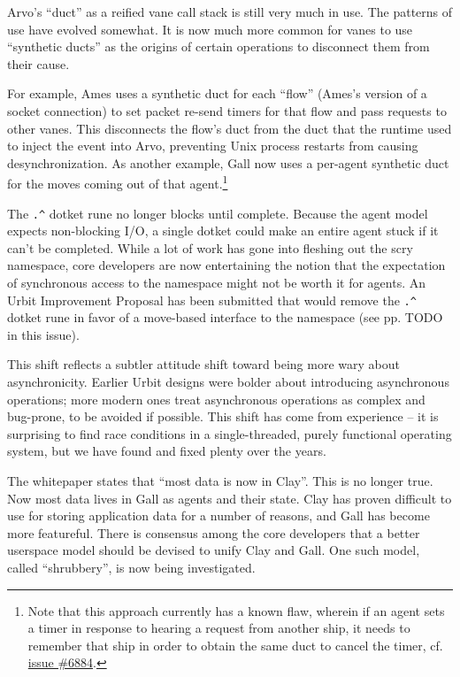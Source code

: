 \documentclass[twoside]{article}
\begin{document}
Arvo's ``duct'' as a reified vane call stack is still very much in use.  The patterns of use have evolved somewhat.  It is now much more common for vanes to use ``synthetic ducts'' as the origins of certain operations to disconnect them from their cause.

For example, Ames uses a synthetic duct for each ``flow'' (Ames's version of a socket connection) to set packet re-send timers for that flow and pass requests to other vanes.  This disconnects the flow's duct from the duct that the runtime used to inject the event into Arvo, preventing Unix process restarts from causing desynchronization.  As another example, Gall now uses a per-agent synthetic duct for the moves coming out of that agent.\footnote{Note that this approach currently has a known flaw, wherein if an agent sets a timer in response to hearing a request from another ship, it needs to remember that ship in order to obtain the same duct to cancel the timer, cf. \href{https://github.com/urbit/urbit/issues/6884}{issue \#6884}.}

The \lstinline[style=inlinecode]{.^} dotket rune no longer blocks until complete.  Because the agent model expects non-blocking I/O, a single dotket could make an entire agent stuck if it can't be completed.  While a lot of work has gone into fleshing out the scry namespace, core developers are now entertaining the notion that the expectation of synchronous access to the namespace might not be worth it for agents.  An Urbit Improvement Proposal has been submitted that would remove the \lstinline[style=inlinecode]{.^} dotket rune in favor of a move-based interface to the namespace (see pp. TODO in this issue).

This shift reflects a subtler attitude shift toward being more wary about asynchronicity.  Earlier Urbit designs were bolder about introducing asynchronous operations; more modern ones treat asynchronous operations as complex and bug-prone, to be avoided if possible.  This shift has come from experience – it is surprising to find race conditions in a single-threaded, purely functional operating system, but we have found and fixed plenty over the years.  

The whitepaper states that ``most data is now in Clay''.  This is no longer true.  Now most data lives in Gall as agents and their state.  Clay has proven difficult to use for storing application data for a number of reasons, and Gall has become more featureful.  There is consensus among the core developers that a better userspace model should be devised to unify Clay and Gall.  One such model, called ``shrubbery'', is now being investigated.
\end{document}
